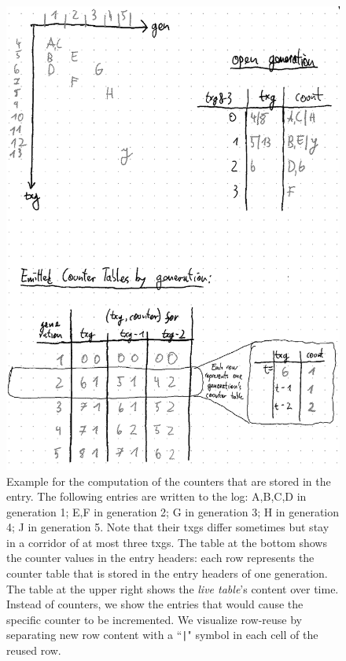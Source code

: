 \documentclass[12pt,a4paper,twoside]{book}
\begin{document}
\begin{figure}[H]
    \centering
    \includegraphics{fig/prb_counters_table__example}
    \caption{
        Example for the computation of the counters that are stored in the entry.
        The following entries are written to the log:
        A,B,C,D in generation 1; E,F in generation 2; G in generation 3; H in generation 4; J in generation 5.
        Note that their txgs differ sometimes but stay in a corridor of at most three txgs.
        The table at the bottom shows the counter values in the entry headers:
        each row represents the counter table that is stored in the entry headers of one generation.
        The table at the upper right shows the \textit{live table}'s content over time.
        Instead of counters, we show the entries that would cause the specific counter to be incremented.
        We visualize row-reuse by separating new row content with a ``\lstinline{|}" symbol in each cell of the reused row.
    }
    \label{fig:prb_counters_table__example}
\end{figure}
\end{document}
